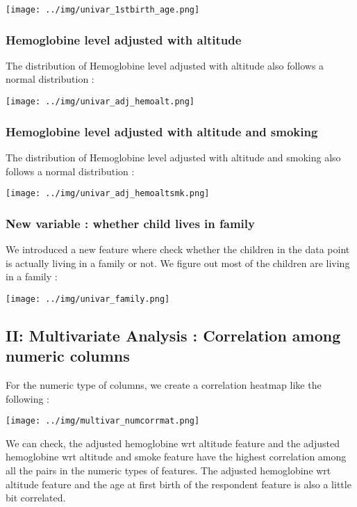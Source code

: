 \texttt{[image: ../img/univar\_1stbirth\_age.png]}


\subsubsection{Hemoglobine level adjusted with altitude}
The distribution of Hemoglobine level adjusted with altitude also follows a normal distribution :

\texttt{[image: ../img/univar\_adj\_hemoalt.png]}




\subsubsection{Hemoglobine level adjusted with altitude and smoking}
The distribution of Hemoglobine level adjusted with altitude and smoking also follows a normal distribution :

\texttt{[image: ../img/univar\_adj\_hemoaltsmk.png]}




\subsubsection{New variable : whether child lives in family}

We introduced a new feature where check whether the children in the data point is actually living in a family or not. We figure out most of the children are living in a family :

\texttt{[image: ../img/univar\_family.png]}



\subsection{II: Multivariate Analysis : Correlation among numeric columns}

For the numeric type of columns, we create a correlation heatmap like the following :

\texttt{[image: ../img/multivar\_numcorrmat.png]}

We can check, the adjusted hemoglobine wrt altitude feature and the adjusted hemoglobine wrt altitude and smoke feature have the highest correlation among all the pairs in the numeric types of features. The adjusted hemoglobine wrt altitude feature and the age at first birth of the respondent feature is also a little bit correlated.



